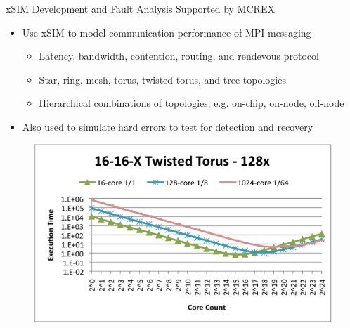 \documentclass{beamer}
\begin{document}

\begin{frame}{xSIM Development and Fault Analysis Supported by MCREX}

  \begin{itemize}
  \item Use xSIM to model communication performance of MPI messaging
    \begin{itemize}
    \item Latency, bandwidth, contention, routing, and rendevous protocol
    \item Star, ring, mesh, torus, twisted torus, and tree topologies
    \item Hierarchical combinations of topologies, e.g. on-chip, on-node,
      off-node
    \end{itemize}
  \item Also used to simulate hard errors to test for detection and recovery
  \end{itemize}
  \vfill
  \begin{figure}
    \centering
    \includegraphics[height=.35\textwidth]{xsim}
  \end{figure}

\end{frame}

\end{document}
